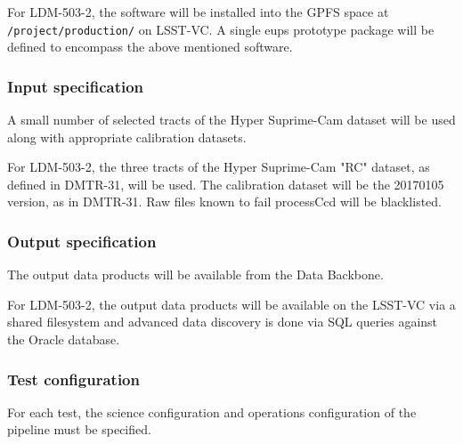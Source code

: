 For LDM-503-2, the software will be installed into the GPFS space
at \texttt{/project/production/} on LSST-VC.  A single eups prototype
package will be defined to encompass the above mentioned software.

\subsubsection{Input specification}\label{sec:input}

A small number of selected tracts of the Hyper Suprime-Cam dataset will be used along with appropriate calibration datasets.

For LDM-503-2, the three tracts of the Hyper Suprime-Cam "RC" dataset, as defined in DMTR-31, will be used.
The calibration dataset will be the 20170105 version, as in DMTR-31.   Raw files known to fail processCcd 
will be blacklisted.

\subsubsection{Output specification}

The output data products will be available from the Data Backbone.

For LDM-503-2, the output data products will be available on the LSST-VC via a shared filesystem and advanced data discovery is done via SQL queries against the Oracle database.


\subsubsection{Test configuration}\label{sec:configuration}

For each test, the science configuration and operations configuration of the pipeline must be specified.

